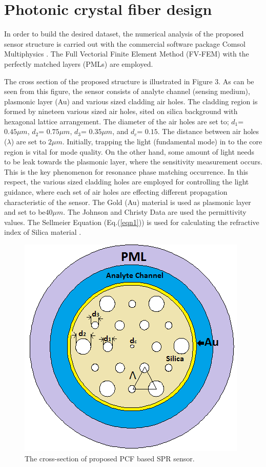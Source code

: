 \documentclass[10pt]{IEEEtran}
\begin{document}
\section{Photonic crystal fiber design}

In order to build the desired dataset, the numerical analysis of the proposed sensor structure is carried out with the commercial software package Comsol Multiphysics \cite{comsol_help}. The Full Vectorial Finite Element Method (FV-FEM) with the perfectly matched layers (PMLs) \cite{koshiba2002full,saitoh2001full} are employed.

The cross section of the proposed structure is illustrated in Figure 3. As can be seen from this figure, the sensor consists of analyte channel (sensing medium), plasmonic layer (Au) and various sized cladding air holes. The cladding region is formed by nineteen various sized air holes, sited on silica background with hexagonal lattice arrangement. The diameter of the air holes are set to;  $d_1$= $0.45 \mu m$, $d_2$= $0.75 \mu m$, $d_3$= $0.35 \mu m$, and  $d_c$= $0.15$. The distance between air holes ($\lambda$) are set to $2 \mu m$. Initially, trapping the light (fundamental mode) in to the core region is vital for mode quality. On the other hand, some amount of light needs to be leak towards the plasmonic layer, where the sensitivity measurement occurs. This is the key phenomenon for resonance phase matching occurrence. In this respect, the various sized cladding holes are employed for controlling the light guidance, where each set of air holes are effecting different propagation characteristic of the sensor. The Gold (Au) material is used as plasmonic layer and set to be$40 \mu m$. The Johnson and Christy Data \cite{johnson1972optical} are used the permittivity values. The Sellmeier Equation (Eq.(\ref{eqn1})) is used for calculating the refractive index of Silica material \cite{bjarklev2003PCF}.


\begin{figure}[]
	\centering
	\includegraphics[width=.6\linewidth]{figures/Figx}
	\caption{The cross-section of proposed  PCF based SPR sensor.}
	\label{Figx}
\end{figure}
\end{document}
